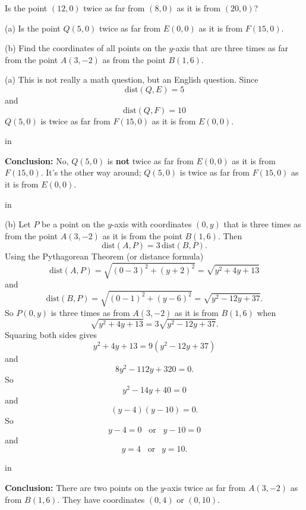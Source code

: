 \documentclass{ximera}
\newcommand{\pskip}{\vskip 0.1 in}
\begin{document}
\begin{exercise}  
  Is the point $(12,0)$ twice as far from $(8,0)$ as it is from $(20,0)$? 
  \begin{multipleChoice}  
        \end{multipleChoice}  
\end{exercise}  



\begin{example}
(a) Is the point $Q(5,0)$ twice as far from $E(0,0)$ as it is from $F(15,0)$.

(b) Find the coordinates of all points on the $y$-axis that are three times as far from the point $A(3,-2)$ as from the point $B(1,6)$. %
\end{example}

\begin{explanation}
(a) This is not really a math question, but an English question. Since
\[
    \text{dist}(Q,E) = 5
\]
and 
\[
    \text{dist}(Q,F) = 10  %
\]
$Q(5,0)$ is twice as far from $F(15,0)$ as it is from $E(0,0)$.

\pskip

{\bf Conclusion:} No, $Q(5,0)$ is {\bf not} twice as far from $E(0,0)$ as it is from $F(15,0)$. It's the other way around; $Q(5,0)$ is twice as far from $F(15,0)$ as it is from $E(0,0)$. 

\pskip

(b) Let $P$ be a point on the $y$-axis with coordinates $(0,y)$ that is three times as  from the point $A(3,-2)$ as it is from the point $B(1,6)$. Then
\[
    \text{dist}(A,P) = 3 \, \text{dist}(B,P) .
\]
Using the Pythagorean Theorem (or distance formula)
\[
    \text{dist}(A,P) = \sqrt{(0-3)^2 + (y+2)^2} = \sqrt{y^2 + 4y + 13}
\]
and
\[
    \text{dist}(B,P) = \sqrt{(0-1)^2 + (y-6)^2} = \sqrt{y^2-12y+37}.
\]
So $P(0,y)$ is  three times as  from $A(3,-2)$ as it is from $B(1,6)$ when
\[
   \sqrt{y^2 + 4y + 13} = 3 \sqrt{y^2-12y+37} .
\]
Squaring both sides gives
\[
  y^2 + 4y + 13 = 9(y^2-12y+37)
\]
and 
\[
        8y^2 - 112y +320 = 0 .
\]
So
\[
     y^2 - 14y + 40 = 0
\]
and
\[
     (y -4 )(y - 10) = 0.
\]
So
\[
     y-4 = 0    \;\;\;  \text{or} \;\;\; y-10=0
\]
and
\[
    y=4  \;\; \; \text{or} \;\;\ y=10 .
\]

\pskip

{\bf Conclusion:} There are two points on the $y$-axis twice as far from $A(3,-2)$ as from $B(1,6)$. They have coordinates $(0,4)$ or $(0,10)$.

\end{explanation}
\end{document}
